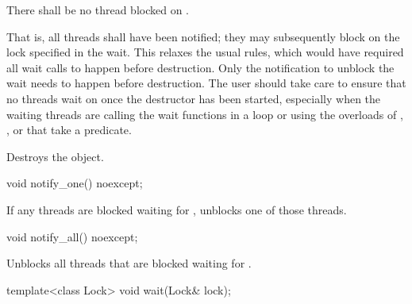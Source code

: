 \begin{itemdescr}
\pnum
\requires There shall be no thread blocked on . \begin{note} That is, all
threads shall have been notified; they may subsequently block on the lock specified in the
wait.
This relaxes the usual rules, which would have required all wait calls to happen before
destruction. Only the notification to unblock the wait needs to happen before destruction.
The user should take care to ensure that no threads wait on  once the destructor has
been started, especially when the waiting threads are calling the wait functions in a loop or
using the overloads of , , or  that take a predicate.
\end{note}

\pnum\effects Destroys the object.
\end{itemdescr}

%
\begin{itemdecl}
void notify_one() noexcept;
\end{itemdecl}

\begin{itemdescr}
\pnum\effects If any threads are blocked waiting for , unblocks one of those threads.
\end{itemdescr}

%
\begin{itemdecl}
void notify_all() noexcept;
\end{itemdecl}

\begin{itemdescr}
\pnum\effects Unblocks all threads that are blocked waiting for .
\end{itemdescr}

%
\begin{itemdecl}
template<class Lock>
  void wait(Lock& lock);
\end{itemdecl}

